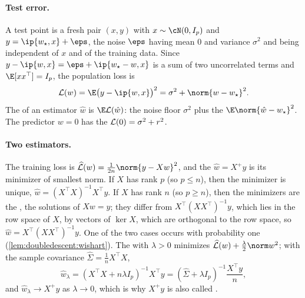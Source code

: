 \begin{refsection}
\paragraph{Test error.} A test point is a fresh pair $(x,y)$ with $x\sim\cN(0,I_p)$ and $y=\ip{w_\star,x}+\eps$, the noise $\eps$ having mean $0$ and variance $\sigma^2$ and being independent of $x$ and of the training data. Since $y-\ip{w,x}=\eps+\ip{w_\star-w,x}$ is a sum of two uncorrelated terms and $\E[xx^\top]=I_p$, the population loss is
\begin{equation}\label{eq:doubledescent:loss}
  \Loss(w)=\E\bigl(y-\ip{w,x}\bigr)^2=\sigma^2+\norm{w-w_\star}^2 .
\end{equation}
The  of an estimator $\hat w$ is $\E\Loss(\hat w)$: the noise floor $\sigma^2$ plus the  $\E\norm{\hat w-w_\star}^2$. The predictor $w=0$ has the  $\mathcal{L}(0)=\sigma^2+r^2$.

\paragraph{Two estimators.} The training loss is $\Lhat(w)=\frac1{2n}\norm{y-Xw}^2$, and the  $\hat w=X^+y$ is its minimizer of smallest norm. If $X$ has rank $p$ (so $p\le n$), then the minimizer is unique, $\hat w=(X^\top X)^{-1}X^\top y$. If $X$ has rank $n$ (so $p\ge n$), then the minimizers are the , the solutions of $Xw=y$; they differ from $X^\top(XX^\top)^{-1}y$, which lies in the row space of $X$, by vectors of $\ker X$, which are orthogonal to the row space, so $\hat w=X^\top(XX^\top)^{-1}y$. One of the two cases occurs with probability one (\cref{lem:doubledescent:wishart}). The  with $\lambda>0$ minimizes $\Lhat(w)+\frac\lambda2\norm w^2$; with the sample covariance $\hat\Sigma=\frac1nX^\top X$,
\begin{equation}\label{eq:doubledescent:ridge}
  \hat w_\lambda=(X^\top X+n\lambda I_p)^{-1}X^\top y=(\hat\Sigma+\lambda I_p)^{-1}\frac{X^\top y}{n},
\end{equation}
and $\hat w_\lambda\to X^+y$ as $\lambda\to0$, which is why $X^+y$ is also called .


\end{refsection}
